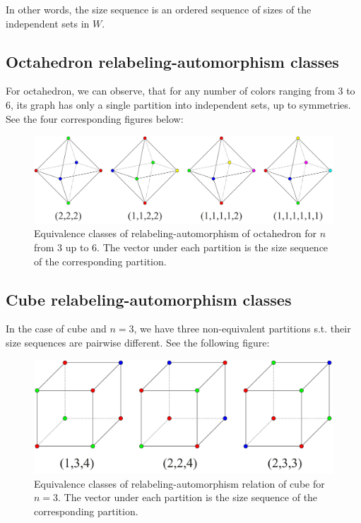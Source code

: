 In other words, the size sequence is an ordered sequence of sizes of the independent sets in $W$.

\subsection{Octahedron relabeling-automorphism classes}

For octahedron, we can observe, that for any number of colors ranging from $3$ to $6$, its graph has only a single partition into independent sets, up to symmetries. See the four corresponding figures below:

\begin{figure}[H]
    \centering
    \includegraphics[width=1\textwidth]{Resources/Figs/octahedron-relaut-classes.pdf}
    \caption{Equivalence classes of relabeling-automorphism of octahedron for $n$ from $3$ up to $6$. The vector under each partition is the size sequence of the corresponding partition.}
    \label{fig:octahedron-relaut-classes}
\end{figure}


\subsection{Cube relabeling-automorphism classes}

In the case of cube and $n=3$, we have three non-equivalent partitions s.t. their size sequences are pairwise different. See the following figure: 

\begin{figure}[H]
    \centering
    \includegraphics[width=1\textwidth]{Resources/Figs/cube_non_relaut-3-clrings.pdf}
    \caption{Equivalence classes of relabeling-automorphism relation of cube for $n=3$. The vector under each partition is the size sequence of the corresponding partition.}
    \label{fig:cube-3clring-relaut-classes}
\end{figure}

